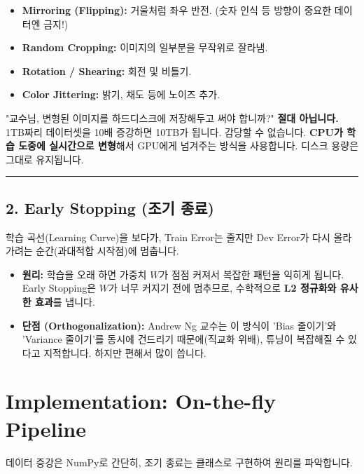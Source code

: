 \documentclass[11pt,a4paper]{book}
\theoremstyle{definition}
\begin{document}
\begin{itemize}
    \item \textbf{Mirroring (Flipping):} 거울처럼 좌우 반전. (숫자 인식 등 방향이 중요한 데이터엔 금지!)
    \item \textbf{Random Cropping:} 이미지의 일부분을 무작위로 잘라냄.
    \item \textbf{Rotation / Shearing:} 회전 및 비틀기.
    \item \textbf{Color Jittering:} 밝기, 채도 등에 노이즈 추가.
\end{itemize}


\begin{tipbox}[title={On-the-fly Generation (실시간 생성)}]
"교수님, 변형된 이미지를 하드디스크에 저장해두고 써야 합니까?"
\textbf{절대 아닙니다.} 1TB짜리 데이터셋을 10배 증강하면 10TB가 됩니다. 감당할 수 없습니다.
\textbf{CPU가 학습 도중에 실시간으로 변형}해서 GPU에게 넘겨주는 방식을 사용합니다. 디스크 용량은 그대로 유지됩니다.
\end{tipbox}

\vspace{0.5cm}\hrule\vspace{0.5cm}

\subsection{2. Early Stopping (조기 종료)}
학습 곡선(Learning Curve)을 보다가, Train Error는 줄지만 Dev Error가 다시 올라가려는 순간(과대적합 시작점)에 멈춥니다.


\begin{itemize}
    \item \textbf{원리:} 학습을 오래 하면 가중치 $W$가 점점 커져서 복잡한 패턴을 익히게 됩니다. Early Stopping은 $W$가 너무 커지기 전에 멈추므로, 수학적으로 \textbf{L2 정규화와 유사한 효과}를 냅니다.
    \item \textbf{단점 (Orthogonalization):} Andrew Ng 교수는 이 방식이 'Bias 줄이기'와 'Variance 줄이기'를 동시에 건드리기 때문에(직교화 위배), 튜닝이 복잡해질 수 있다고 지적합니다. 하지만 편해서 많이 씁니다.
\end{itemize}

\section{Implementation: On-the-fly Pipeline}

데이터 증강은 NumPy로 간단히, 조기 종료는 클래스로 구현하여 원리를 파악합니다.
\end{document}
